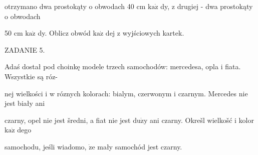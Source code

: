 \documentclass[a4paper,12pt]{article}
\begin{document}
otrzymano dwa prostokąty o obwodach 40 cm $\mathrm{k}\mathrm{a}\dot{\mathrm{z}}$ dy, z drugiej - dwa prostokąty o obwodach

50 cm $\mathrm{k}\mathrm{a}\dot{\mathrm{z}}$ dy. Oblicz obwód $\mathrm{k}\mathrm{a}\dot{\mathrm{z}}$ dej z wyjściowych kartek.

ZADANIE 5.

Adaś dostał pod choinkę modele trzech samochodów: mercedesa, opla i fiata. Wszystkie są róz-

nej wielkości i w róznych kolorach: bialym, czerwonym i czarnym. Mercedes nie jest biały ani

czarny, opel nie jest šredni, a fiat nie jest $\mathrm{d}\mathrm{u}\dot{\mathrm{z}}\mathrm{y}$ ani czarny. Okrešl wielkošć i kolor $\mathrm{k}\mathrm{a}\dot{\mathrm{z}}$ dego

samochodu, jeśli wiadomo, $\dot{\mathrm{z}}\mathrm{e}$ mały samochód jest czarny.
\end{document}
